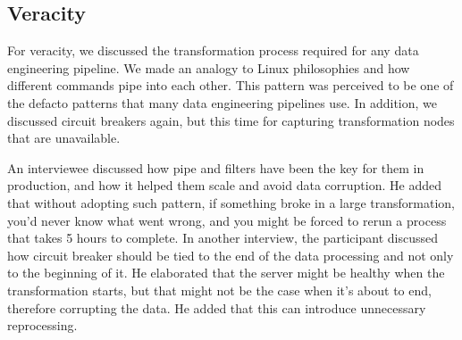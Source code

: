 \documentclass[a4paper,11pt,article,oneside]{memoir}
\begin{document}





\subsection{Veracity}

For veracity, we discussed the transformation process required for any data engineering pipeline. We made an analogy to Linux philosophies and how different commands pipe into each other. This pattern was perceived to be one of the defacto patterns that many data engineering pipelines use. In addition, we discussed circuit breakers again, but this time for capturing transformation nodes that are unavailable.


An interviewee discussed how pipe and filters have been the key for them in production, and how it helped them scale and avoid data corruption. He added that without adopting such pattern, if something broke in a large transformation, you'd never know what went wrong, and you might be forced to rerun a process that takes 5 hours to complete. In another interview, the participant discussed how circuit breaker should be tied to the end of the data processing and not only to the beginning of it. He elaborated that the server might be healthy when the transformation starts, but that might not be the case when it's about to end, therefore corrupting the data. He added that this can introduce unnecessary reprocessing. 

\end{document}
